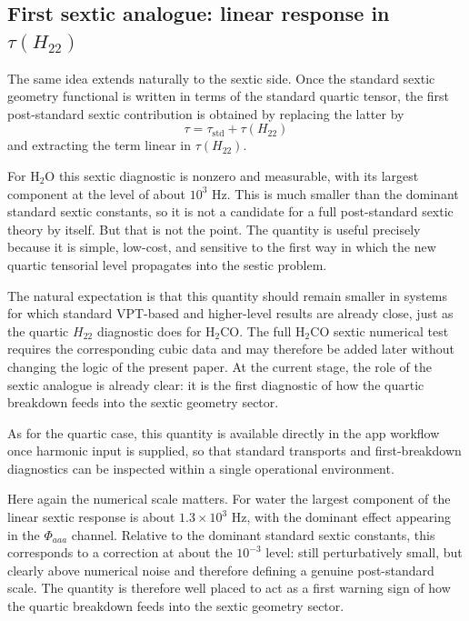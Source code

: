 \subsection{First sextic analogue: linear response in \texorpdfstring{$\tau(H_{22})$}{tau(H22)}}

The same idea extends naturally to the sextic side. Once the standard sextic
geometry functional is written in terms of the standard quartic tensor, the
first post-standard sextic contribution is obtained by replacing the latter by
\begin{equation}
\tau = \tau_{\mathrm{std}} + \tau(H_{22})
\end{equation}
and extracting the term linear in $\tau(H_{22})$.

For H$_2$O this sextic diagnostic is nonzero and measurable, with its largest
component at the level of about $10^3$ Hz. This is much smaller than the
dominant standard sextic constants, so it is not a candidate for a full
post-standard sextic theory by itself. But that is not the point. The
quantity is useful precisely because it is simple, low-cost, and sensitive to
the first way in which the new quartic tensorial level propagates into the
sestic problem.

The natural expectation is that this quantity should remain smaller in systems
for which standard VPT-based and higher-level results are already close, just
as the quartic $H_{22}$ diagnostic does for H$_2$CO. The full H$_2$CO sextic
numerical test requires the corresponding cubic data and may therefore be
added later without changing the logic of the present paper. At the current
stage, the role of the sextic analogue is already clear: it is the first
diagnostic of how the quartic breakdown feeds into the sextic geometry sector.

As for the quartic case, this quantity is available directly in the app
workflow once harmonic input is supplied, so that standard transports and
first-breakdown diagnostics can be inspected within a single operational
environment.

Here again the numerical scale matters. For water the largest component of the
linear sextic response is about $1.3\times 10^3$ Hz, with the dominant effect
appearing in the $\Phi_{aaa}$ channel. Relative to the dominant standard
sextic constants, this corresponds to a correction at about the $10^{-3}$
level: still perturbatively small, but clearly above numerical noise and
therefore defining a genuine post-standard scale. The quantity is therefore
well placed to act as a first warning sign of how the quartic breakdown feeds
into the sextic geometry sector.

